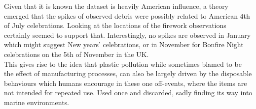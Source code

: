 \documentclass[10pt]{article}\usepackage[]{graphicx}\usepackage[]{color}
\begin{document}
Given that it is known the dataset is heavily American influence, a theory emerged that the spikes of observed debris were possibly related to American 4th of July celebrations. Looking at the locations of the firework observations certainly seemed to support that. Interestingly, no spikes are observed in January which might suggest New years' celebrations, or in November for Bonfire Night celebrations on the 5th of November in the UK.\\

This gives rise to the idea that plastic pollution while sometimes blamed to be the effect of manufacturing processes, can also be largely driven by the disposable behaviours which humans encourage in these one off-events, where the items are not intended for repeated use. Used once and discarded, sadly finding its way into marine environments.
\end{document}
